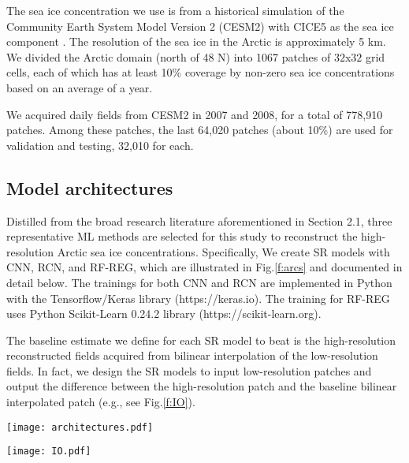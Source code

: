 \documentclass[]{copernicus}
\begin{document}
The sea ice concentration we use is from a historical simulation of the Community Earth System Model Version 2 (CESM2) with CICE5 as the sea ice component \citep{danabasoglu2020community}. The resolution of the sea ice in the Arctic is approximately 5 km. We divided the Arctic domain (north of 48 N) into 1067 patches of $32$x$32$ grid cells, each of which has at least 10\% coverage by non-zero sea ice concentrations based on an average of a year. 

We acquired daily fields from CESM2 in 2007 and 2008, for a total of 778,910 patches. Among these patches, the last 64,020 patches (about 10\%) are used for validation and testing, 32,010 for each. 

\subsection{Model architectures}
Distilled from the broad research literature aforementioned in Section 2.1, three representative ML methods are selected for this study to reconstruct the high-resolution Arctic sea ice concentrations. Specifically, We create SR models with CNN, RCN, and RF-REG, which are illustrated in Fig.\ref{f:arcs} and documented in detail below. The trainings for both CNN and RCN are implemented in Python with the Tensorflow/Keras library (https://keras.io). The training for RF-REG uses Python Scikit-Learn 0.24.2 library (https://scikit-learn.org). 

The baseline estimate we define for each SR model to beat is the high-resolution reconstructed fields acquired from bilinear interpolation of the low-resolution fields. In fact,
we design the SR models to input low-resolution patches and output the difference between the high-resolution patch and the baseline bilinear interpolated patch (e.g., see Fig.\ref{f:IO}).

\begin{figure*}
\centering
\noindent\texttt{[image: architectures.pdf]}
\caption{The architectures for (a) CNN, (b) RCN, and (c) RF-REG with $m$=4.}
\label{f:arcs}
\end{figure*}


\begin{figure*}
\centering
\noindent\texttt{[image: IO.pdf]}
\caption{Sample input and output with $m$=4 for our SR models. (a) $H_b$, the bilinear interpolated high resolution as baseline. (b) $H$, the original high resolution. (c) $L$, the coarse-grained low-resolution as input. (d) $H-H_b$, the difference between $H$ and $H_b$ as the prediction target. (e) Sea ice concentration patches of 32$\times$32 selected (red squares) over the Arctic.}
\label{f:IO}
\end{figure*}
\end{document}
